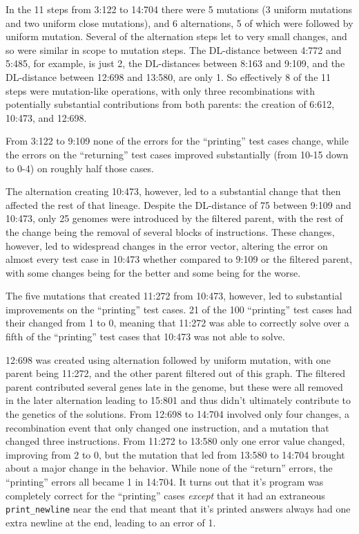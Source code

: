 In the 11 steps from 3:122 to 14:704 there were 5 mutations (3 
uniform mutations and two uniform close mutations), and 6 alternations,
5 of which were followed by uniform mutation. Several of the alternation
steps let to very small changes, and so were similar in scope to mutation
steps. The DL-distance between 4:772 and 5:485, for example, is just 2, the
DL-distances between 8:163 and 9:109, and the DL-distance between 12:698 
and 13:580, are only 1. So effectively 8 of the 11 steps were mutation-like
operations, with only three recombinations with potentially substantial
contributions from both parents: the creation of 6:612, 10:473, and 12:698.

From 3:122 to 9:109 none of the errors for the ``printing'' test cases change,
while the errors on the ``returning'' test cases improved substantially
(from 10-15 down to 0-4) on roughly half those cases.

The alternation creating 10:473, however, led to a substantial change that
then affected the rest of that lineage. Despite the DL-distance of 75 between 9:109 and 10:473, only 25 genomes were introduced by the filtered parent,
with the rest of the change being the removal of several blocks of 
instructions. These changes, however, led to widespread changes in the error
vector, altering the error on almost every test case in 10:473 whether 
compared to 9:109 or the filtered parent, with some changes being for the
better and some being for the worse. 

The five mutations that created 11:272 from 10:473, however, led to substantial
improvements on the ``printing'' test cases. 21 of the 100 ``printing'' 
test cases had their changed from 1 to 0, meaning that 11:272 was able to
correctly solve over a fifth of the ``printing'' test cases that 10:473 was not
able to solve.

12:698 was created using alternation followed by uniform mutation, with one parent being 11:272, and the other parent filtered out of this graph. The 
filtered parent contributed several genes late in the genome, but these were
all removed in the later alternation leading to 15:801 and thus didn't 
ultimately contribute to the genetics of the solutions. From 12:698 to 14:704
involved only four changes, a recombination event that only changed one
instruction, and a mutation that changed three instructions. From 11:272 to 13:580 only one error value changed, improving from 2 to 0, but the mutation
that led from 13:580 to 14:704 brought about a major change in the behavior.
While none of the ``return'' errors, the ``printing'' errors all became 1 in
14:704. It turns out that it's program was completely correct for the
``printing'' cases \emph{except} that it had an extraneous 
\texttt{print\_newline} near the end that meant that it's printed answers
always had one extra newline at the end, leading to an error of 1.

